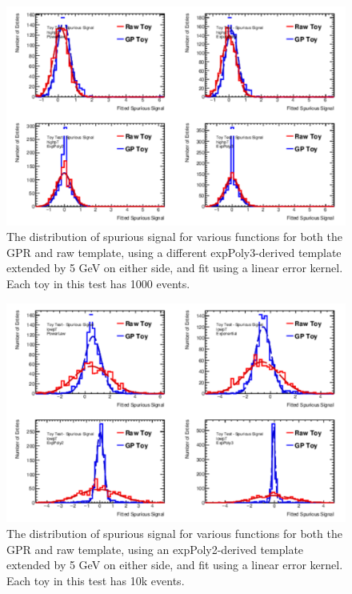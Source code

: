 \begin{figure} 
\begin{center}
  \includegraphics[width=\textwidth]{figures/background/gpr/validation/linear/ToyTest_FitSigVals_highpT_1000_noSig}   
\caption{The distribution of spurious signal for various functions for both the GPR and raw template, using a different expPoly3-derived template extended by 5 GeV on either side, and fit using a linear error kernel. Each toy in this test has 1000 events.}
\label{fig:linearkernel_highpt_1000_noSig}
\end{center}
\end{figure}

\begin{figure} 
\begin{center}
  \includegraphics[width=\textwidth]{figures/background/gpr/validation/linear/ToyTest_FitSigVals_lowpT_10k_noSig}   
\caption{The distribution of spurious signal for various functions for both the GPR and raw template, using an expPoly2-derived template extended by 5 GeV on either side, and fit using a linear error kernel. Each toy in this test has 10k events.}
\label{fig:linearkernel_lowpt_10k_noSig}
\end{center}
\end{figure}

